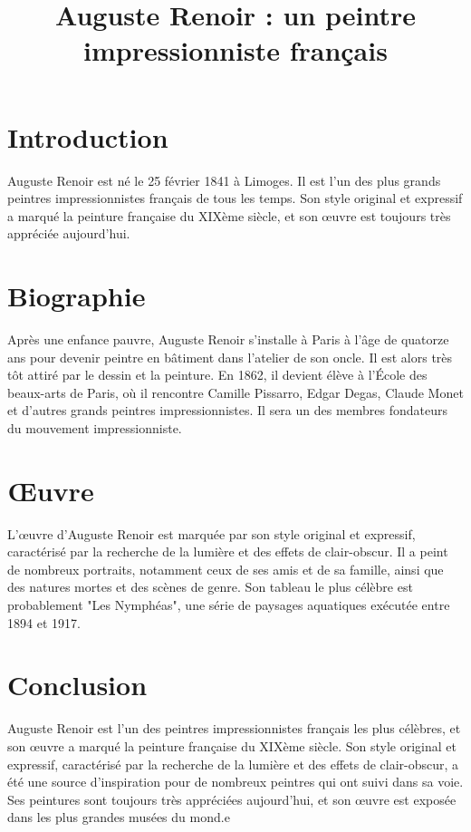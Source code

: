 \documentclass[12pt, a4paper]{article}
\title{Auguste Renoir : un peintre impressionniste français}
\author{}
\date{}
\begin{document}
\maketitle

\section{Introduction}
Auguste Renoir est né le 25 février 1841 à Limoges. Il est l'un des plus grands peintres impressionnistes français de tous les temps. Son style original et expressif a marqué la peinture française du XIXème siècle, et son œuvre est toujours très appréciée aujourd'hui.

\section{ Biographie }
Après une enfance pauvre, Auguste Renoir s'installe à Paris à l'âge de quatorze ans pour devenir peintre en bâtiment dans l'atelier de son oncle. Il est alors très tôt attiré par le dessin et la peinture. En 1862, il devient élève à l'École des beaux-arts de Paris, où il rencontre Camille Pissarro, Edgar Degas, Claude Monet et d'autres grands peintres impressionnistes. Il sera un des membres fondateurs du mouvement impressionniste.

\section{ Œuvre }
L'œuvre d'Auguste Renoir est marquée par son style original et expressif, caractérisé par la recherche de la lumière et des effets de clair-obscur. Il a peint de nombreux portraits, notamment ceux de ses amis et de sa famille, ainsi que des natures mortes et des scènes de genre. Son tableau le plus célèbre est probablement "Les Nymphéas", une série de paysages aquatiques exécutée entre 1894 et 1917.

\section{Conclusion }
Auguste Renoir est l'un des peintres impressionnistes français les plus célèbres, et son œuvre a marqué la peinture française du XIXème siècle. Son style original et expressif, caractérisé par la recherche de la lumière et des effets de clair-obscur, a été une source d'inspiration pour de nombreux peintres qui ont suivi dans sa voie. Ses peintures sont toujours très appréciées aujourd'hui, et son œuvre est exposée dans les plus grandes musées du mond.e
\end{document}
